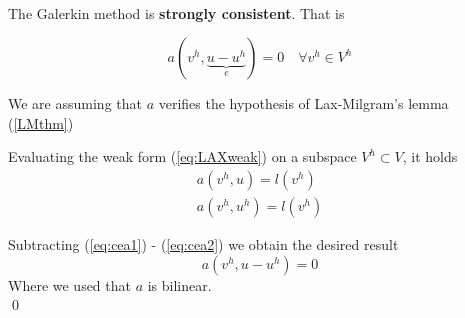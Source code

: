 \newpage

  
  
  
  


\begin{lemma}[Céa]\-\\
  The Galerkin method is \textbf{strongly consistent}. That is
  
  \[
    a(v^h, \underbrace{u-u^h}_e) = 0 \quad \forall v^h \in V^h
  \]
\end{lemma}

\begin{remark}
  We are assuming that $a$ verifies the hypothesis of Lax-Milgram's lemma (\ref{LMthm})
\end{remark}



\begin{demo}
  Evaluating the weak form (\ref{eq:LAXweak}) on a subspace $V^h \subset V$, it holds
  \begin{align}
      a(v^h,u) = l(v^h)\label{eq:cea1}\\ 
      a(v^h,u^h) = l(v^h) \label{eq:cea2}
  \end{align}
  
  Subtracting (\ref{eq:cea1}) - (\ref{eq:cea2}) we obtain the desired result
  \[
    a(v^h, u-u^h) = 0
  \]
  Where we used that $a$ is bilinear. \\\qed
\end{demo}

